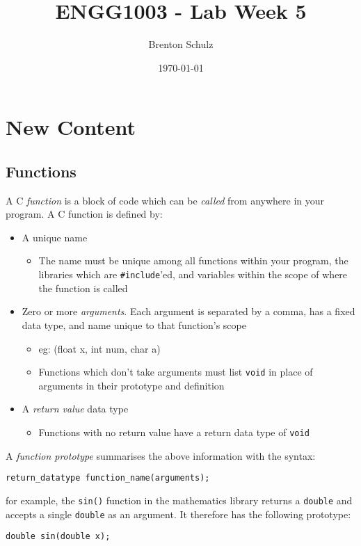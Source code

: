 \documentclass{lab}
\title{ENGG1003 - Lab Week 5}
\author{Brenton Schulz}
\date{\today}
\begin{document}
\maketitle

\section{New Content}

\subsection{Functions}

A C \textit{function} is a block of code which can be \textit{called} from anywhere in your program. A C function is defined by:

\begin{itemize}
	\item A unique name
		\begin{itemize}
			\item The name must be unique among all functions within your program, the libraries which are \texttt{\#include}'ed, and variables within the scope of where the function is called
		\end{itemize}
	\item Zero or more \textit{arguments}. Each argument is separated by a comma, has a fixed data type, and name unique to that function's scope
		\begin{itemize}
			\item eg: (float x, int num, char a)
			\item Functions which don't take arguments must list \texttt{void} in place of arguments in their prototype and definition
		\end{itemize}
	\item A \textit{return value} data type
		\begin{itemize}
			\item Functions with no return value have a return data type of \texttt{void}
		\end{itemize}
\end{itemize}

A \textit{function prototype} summarises the above information with the syntax:
\begin{lstlisting}[style=CStyle]
return_datatype function_name(arguments);
\end{lstlisting}
for example, the \texttt{sin()} function in the mathematics library returns a \texttt{double} and accepts a single \texttt{double} as an argument. It therefore has the following prototype:
\begin{lstlisting}[style=CStyle]
double sin(double x);
\end{lstlisting}
\end{document}
